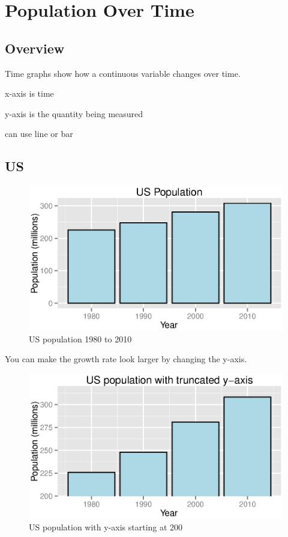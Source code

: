\documentclass{exam}
\begin{document}
  \section{Population Over Time}

  \subsection{Overview}

  Time graphs show how a continuous variable changes over time.  

  \begin{itemize*}
    \item x-axis is time
    \item y-axis is the quantity being measured
    \item can use line or bar
  \end{itemize*}

  \subsection{US}
  \begin{figure}[H]
    \centering
    \includegraphics[scale = 0.9]{figures/us_population.eps}
    \caption{US population 1980 to 2010}
  \end{figure}

  You can make the growth rate look larger by changing the y-axis.
  \begin{figure}[H]
    \centering
    \includegraphics[scale = 0.9]{figures/us_population_limited_range.eps}
    \caption{US population with y-axis starting at 200}
  \end{figure}
\end{document}

